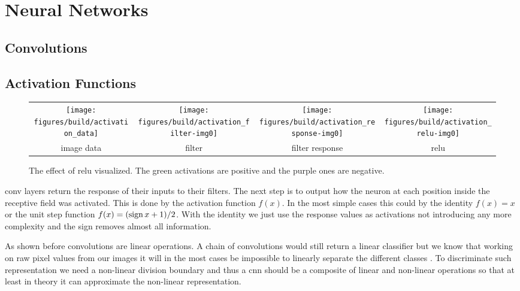 \section{Neural Networks}
\label{sec:concepts:nn}

\subsection{Convolutions} %
\label{sub:conepts:nn:conv}

\subsection{Activation Functions} %
\label{sub:conepts:nn:activations}
\begin{figure}
    \centering
    \begin{tabulary}{\linewidth}{CCCC}
        \texttt{[image: figures/build/activation\_data]} &
        \vspace{-1.8cm}\texttt{[image: figures/build/activation\_filter-img0]} &
        \texttt{[image: figures/build/activation\_response-img0]} &
        \texttt{[image: figures/build/activation\_relu-img0]} \\
        image data & filter & filter response & \gls{relu} \\
    \end{tabulary}
    \caption{The effect of \gls{relu} visualized. The green activations are positive and the purple ones are negative.}
\end{figure}
\gls{conv} layers return the response of their inputs to their filters. The next step is to output how the neuron at each position inside the receptive field was activated. This is done by the activation function $f(x)$. In the most simple cases this could by the identity $f(x) = x$ or the unit step function $f(x) = (\operatorname{sign} x + 1) / 2$. With the identity we just use the response values as activations not introducing any more complexity and the sign removes almost all information.

As shown before convolutions are linear operations. A chain of convolutions would still return a linear classifier but we know that working on raw pixel values from our images it will in the most cases be impossible to linearly separate the different classes \citep{lecun_deep_2015}. To discriminate such representation we need a non-linear division boundary and thus a \gls{cnn} should be a composite of linear and non-linear operations so that at least in theory it can approximate the non-linear representation.

